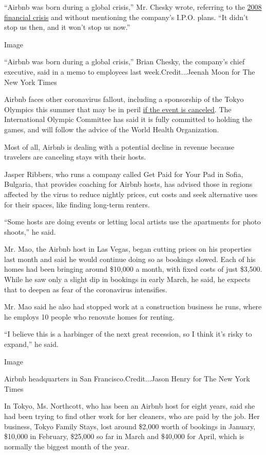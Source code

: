 ``Airbnb was born during a global crisis,'' Mr. Chesky wrote, referring
to the
\href{https://www.nytimes3xbfgragh.onion/2008/09/19/news/19iht-19oxan-CRISIS.16311607.html}{2008
financial crisis} and without mentioning the company's I.P.O. plans.
``It didn't stop us then, and it won't stop us now.''

Image

``Airbnb was born during a global crisis,'' Brian Chesky, the company's
chief executive, said in a memo to employees last week.Credit...Jeenah
Moon for The New York Times

Airbnb faces other coronavirus fallout, including a sponsorship of the
Tokyo Olympics this summer that may be in peril
\href{https://www.nytimes3xbfgragh.onion/2020/03/05/sports/olympics/coronavirus-tokyo.html}{if
the event is canceled}. The International Olympic Committee has said it
is fully committed to holding the games, and will follow the advice of
the World Health Organization.

Most of all, Airbnb is dealing with a potential decline in revenue
because travelers are canceling stays with their hosts.

Jasper Ribbers, who runs a company called Get Paid for Your Pad in
Sofia, Bulgaria, that provides coaching for Airbnb hosts, has advised
those in regions affected by the virus to reduce nightly prices, cut
costs and seek alternative uses for their spaces, like finding long-term
renters.

``Some hosts are doing events or letting local artists use the
apartments for photo shoots,'' he said.

Mr. Mao, the Airbnb host in Las Vegas, began cutting prices on his
properties last month and said he would continue doing so as bookings
slowed. Each of his homes had been bringing around \$10,000 a month,
with fixed costs of just \$3,500. While he saw only a slight dip in
bookings in early March, he said, he expects that to deepen as fear of
the coronavirus intensifies.

Mr. Mao said he also had stopped work at a construction business he
runs, where he employs 10 people who renovate homes for renting.

``I believe this is a harbinger of the next great recession, so I think
it's risky to expand,'' he said.

Image

Airbnb headquarters in San Francisco.Credit...Jason Henry for The New
York Times

In Tokyo, Ms. Northcott, who has been an Airbnb host for eight years,
said she had been trying to find other work for her cleaners, who are
paid by the job. Her business, Tokyo Family Stays, lost around \$2,000
worth of bookings in January, \$10,000 in February, \$25,000 so far in
March and \$40,000 for April, which is normally the biggest month of the
year.

